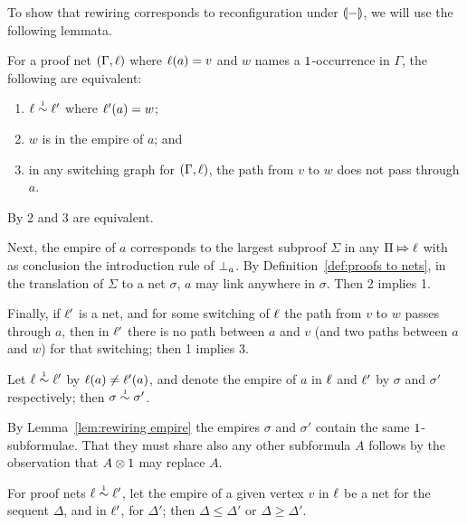 \documentclass[conference]{IEEEtran}
\begin{document}
To show that rewiring corresponds to reconfiguration under $\llparenthesis-\rrparenthesis$, we will use the following lemmata.


\begin{lemma}
\label{lem:rewiring within empire}
For a proof net $(\Gamma,\ell)$ where $\ell(a)=v$ and $w$ names a $1$-occurrence in $\Gamma$, the following are equivalent:
%
\begin{enumerate}
	\item
$\links\perm*\links'$ where $\ell'(a)=w$;
	\item
$w$ is in the empire of $a$; and
	\item
in any switching graph for $(\Gamma,\ell)$, the path from $v$ to $w$ does not pass through $a$.
\end{enumerate}
\end{lemma}


\begin{IEEEproof}
By \cite[Proposition 2.a]{Bellin-vandeWiele-1995} 2 and 3 are equivalent.

Next, the empire of $a$ corresponds to the largest subproof $\Sigma$ in any $\Pi\Mapsto\ell$ with as conclusion the introduction rule of $\bot_{a}$.
%
By Definition~\ref{def:proofs to nets}, in the translation of $\Sigma$ to a net $\sigma$, $a$ may link anywhere in $\sigma$.
%
Then 2 implies 1. 

Finally, if $\ell'$ is a net, and for some switching of $\ell$ the path from $v$ to $w$ passes through $a$, then in $\ell'$ there is no path between $a$ and $v$ (and two paths between $a$ and $w$) for that switching; then 1 implies 3.
%
\end{IEEEproof}


\begin{lemma}
\label{lem:rewiring preserves empire}
Let $\links\perm*\links'$ by $\ell(a)\neq\ell'(a)$, and denote the empire of $a$ in $\ell$ and $\ell'$ by $\sigma$ and $\sigma'$ respectively; then $\sigma\perm*\sigma'$.
\end{lemma}

\begin{IEEEproof}
By Lemma~\ref{lem:rewiring empire} the empires $\sigma$ and $\sigma'$ contain the same $1$-subformulae.
%
That they must share also any other subformula $A$ follows by the observation that $A\otimes1$ may replace $A$.
%
\end{IEEEproof}



\begin{lemma}
\label{lem:rewiring affects empires}
For proof nets $\links\perm*\links'$, let the empire of a given vertex $v$ in $\ell$ be a net for the sequent $\Delta$, and in $\ell'$, for $\Delta'$; then $\Delta\leq\Delta'$ or $\Delta\geq\Delta'$.
\end{lemma}
\end{document}
